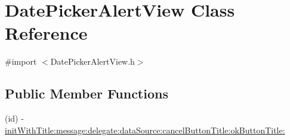\hypertarget{interface_date_picker_alert_view}{
\section{DatePickerAlertView Class Reference}
\label{interface_date_picker_alert_view}
}


{\ttfamily \#import $<$DatePickerAlertView.h$>$}

\subsection*{Public Member Functions}
\begin{DoxyCompactItemize}
\item 
(id) -\/ \hyperlink{interface_date_picker_alert_view_ad5be267319c81b599185f0c333852ad5}{initWithTitle:message:delegate:dataSource:cancelButtonTitle:okButtonTitle:}
\end{DoxyCompactItemize}
